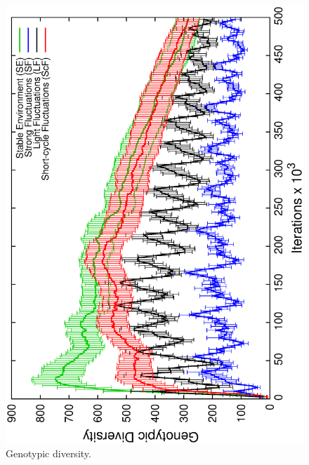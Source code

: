 \begin{figure}[t]
\centering
\includegraphics[width=0.7\columnwidth, angle=-90]{img/GenoDiv}
\caption{Genotypic diversity.}
\label{fig:genodiv}
\end{figure}




